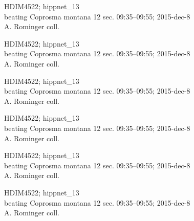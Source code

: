 \documentclass[2pt]{extarticle}
\begin{document}
\noindent
\parbox{0.16\textwidth}{\tiny \raggedright \rule[-0.3\baselineskip]{0pt}{10pt}HDIM4522; hippnet\_13\\ beating Coprosma montana 12 sec. 09:35--09:55; 2015-dec-8\\ A. Rominger coll.}
\parbox{0.16\textwidth}{\tiny \raggedright \rule[-0.3\baselineskip]{0pt}{10pt}HDIM4522; hippnet\_13\\ beating Coprosma montana 12 sec. 09:35--09:55; 2015-dec-8\\ A. Rominger coll.}
\parbox{0.16\textwidth}{\tiny \raggedright \rule[-0.3\baselineskip]{0pt}{10pt}HDIM4522; hippnet\_13\\ beating Coprosma montana 12 sec. 09:35--09:55; 2015-dec-8\\ A. Rominger coll.}
\parbox{0.16\textwidth}{\tiny \raggedright \rule[-0.3\baselineskip]{0pt}{10pt}HDIM4522; hippnet\_13\\ beating Coprosma montana 12 sec. 09:35--09:55; 2015-dec-8\\ A. Rominger coll.}
\parbox{0.16\textwidth}{\tiny \raggedright \rule[-0.3\baselineskip]{0pt}{10pt}HDIM4522; hippnet\_13\\ beating Coprosma montana 12 sec. 09:35--09:55; 2015-dec-8\\ A. Rominger coll.}
\parbox{0.16\textwidth}{\tiny \raggedright \rule[-0.3\baselineskip]{0pt}{10pt}HDIM4522; hippnet\_13\\ beating Coprosma montana 12 sec. 09:35--09:55; 2015-dec-8\\ A. Rominger coll.} \\ 
\vspace{0.001in} 
\end{document}

